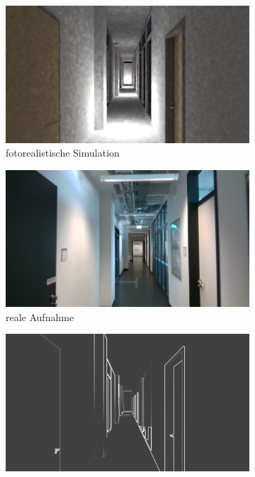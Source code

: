 \begin{figure}[H]
\begin{subfigure}[t]{0.24\linewidth}
		\includegraphics[width=\linewidth]{images/syn_dataset/c00708.png}
		\caption{fotorealistische \hspace{1cm} Simulation}
		\label{subfig:photorealistic}
	\end{subfigure}
	\hfill 
	\begin{subfigure}[t]{0.24\linewidth}
		\centering
		\includegraphics[width=\linewidth]{images/syn_dataset/r000305.png}
		\caption{reale Aufnahme}
		\label{subfig:real}
	\end{subfigure}
	\hfill 
	\begin{subfigure}[t]{0.24\linewidth}
		\centering
		\includegraphics[width=\linewidth]{images/syn_dataset/bg00708.png}

\end{subfigure}
\end{figure}

